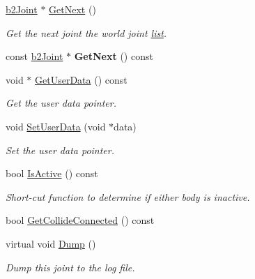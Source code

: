 \begin{DoxyCompactItemize}
\mbox{\label{classb2Joint_aac2aacb3b73393a0d5cdc18b38f42014}} 
\hyperlink{classb2Joint}{b2\+Joint} $\ast$ \hyperlink{classb2Joint_aac2aacb3b73393a0d5cdc18b38f42014}{Get\+Next} ()
\begin{DoxyCompactList}\small\item\em Get the next joint the world joint \hyperlink{protocollist-p}{list}. \end{DoxyCompactList}\item 
\mbox{\label{classb2Joint_a6879beaffb647784ceffdeedba69085d}} 
const \hyperlink{classb2Joint}{b2\+Joint} $\ast$ {\bfseries Get\+Next} () const
\item 
\mbox{\label{classb2Joint_a2008a45eff03a20d7e4304b6d61bc0c5}} 
void $\ast$ \hyperlink{classb2Joint_a2008a45eff03a20d7e4304b6d61bc0c5}{Get\+User\+Data} () const
\begin{DoxyCompactList}\small\item\em Get the user data pointer. \end{DoxyCompactList}\item 
\mbox{\label{classb2Joint_a492f2d02496437572aaec6013ebdc1c8}} 
void \hyperlink{classb2Joint_a492f2d02496437572aaec6013ebdc1c8}{Set\+User\+Data} (void $\ast$data)
\begin{DoxyCompactList}\small\item\em Set the user data pointer. \end{DoxyCompactList}\item 
\mbox{\label{classb2Joint_ae9cfbd158216c9855c2f018ff3c9c922}} 
bool \hyperlink{classb2Joint_ae9cfbd158216c9855c2f018ff3c9c922}{Is\+Active} () const
\begin{DoxyCompactList}\small\item\em Short-\/cut function to determine if either body is inactive. \end{DoxyCompactList}\item 
bool \hyperlink{classb2Joint_a48492903df96c8a7b8cad8ed826f8cb0}{Get\+Collide\+Connected} () const
\item 
\mbox{\label{classb2Joint_abd35e7316017ad9a40d5dbf9b5ba3f36}} 
virtual void \hyperlink{classb2Joint_abd35e7316017ad9a40d5dbf9b5ba3f36}{Dump} ()
\begin{DoxyCompactList}\small\item\em Dump this joint to the log file. \end{DoxyCompactList}\item 

\end{DoxyCompactItemize}
